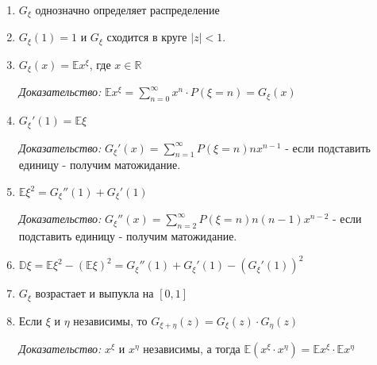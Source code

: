 \begin{properties}
    \begin{enumerate}
        \item {
            $G_{\xi}$ однозначно определяет распределение
        }
        \item {
            $G_{\xi}(1) = 1$ и $G_{\xi}$ сходится в круге $|z| < 1$.
        }
        \item {
            $G_{\xi} (x) = \mathbb{E} x^{\xi}$, где $x \in \mathbb{R}$

            \textit{Доказательство: } $\mathbb{E} x^{\xi} = \sum_{n=0}^{\infty} x^{n} \cdot P(\xi = n) = G_{\xi} (x)$
        }
        \item {
            $G_{\xi}'(1) = \mathbb{E} \xi$

            \textit{Доказательство: } $G_{\xi}'(x) = \sum_{n = 1}^{\infty} P(\xi = n) nx^{n-1}$ - если подставить единицу - получим матожидание.
        }
        \item {
            $\mathbb{E}\xi^2 = G_{\xi}''(1) + G_{\xi}'(1)$

            \textit{Доказательство: } $G_{\xi}''(x) = \sum_{n = 2}^{\infty} P(\xi = n) n(n-1)x^{n-2}$ - если подставить единицу - получим матожидание.
        }
        \item {
            $\mathbb{D} \xi = \mathbb{E}\xi^2 - (\mathbb{E}\xi)^2  = G_{\xi}''(1) + G_{\xi}'(1) - (G_{\xi}'(1))^2$
        }
        \item {
            $G_{\xi}$ возрастает и выпукла на $[0, 1]$
        }
        \item {
            Если $\xi$ и $\eta$ независимы, то $G_{\xi + \eta}(z) = G_{\xi}(z) \cdot G_{\eta}(z)$
    
            \textit{Доказательство: } $x^\xi$ и $x^\eta$ независимы, а тогда $\mathbb{E} (x^\xi \cdot x^\eta) = \mathbb{E} x^{\xi} \cdot \mathbb{E} x^{\eta}$
        }
    \end{enumerate}
\end{properties}

